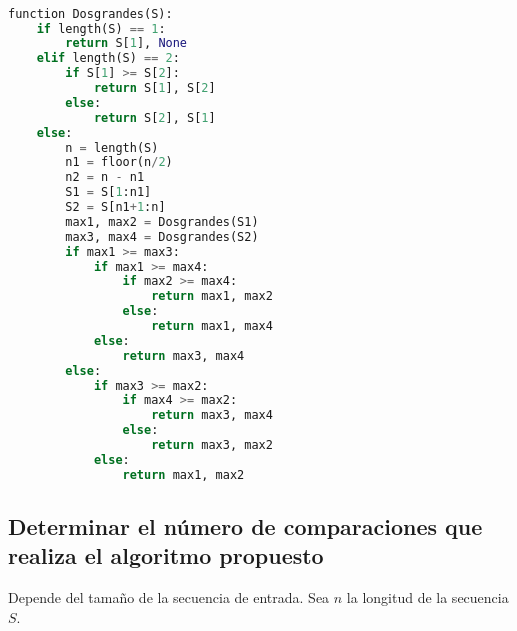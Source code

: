 \begin{lstlisting}[language=python]

function Dosgrandes(S):
    if length(S) == 1:
        return S[1], None
    elif length(S) == 2:
        if S[1] >= S[2]:
            return S[1], S[2]
        else:
            return S[2], S[1]
    else:
        n = length(S)
        n1 = floor(n/2)
        n2 = n - n1
        S1 = S[1:n1]
        S2 = S[n1+1:n]
        max1, max2 = Dosgrandes(S1)
        max3, max4 = Dosgrandes(S2)
        if max1 >= max3:
            if max1 >= max4:
                if max2 >= max4:
                    return max1, max2
                else:
                    return max1, max4
            else:
                return max3, max4
        else:
            if max3 >= max2:
                if max4 >= max2:
                    return max3, max4
                else:
                    return max3, max2
            else:
                return max1, max2
\end{lstlisting}


\subsection{Determinar el número de comparaciones que realiza el algoritmo propuesto}

Depende del tamaño de la secuencia de entrada. Sea $n$ la longitud de la secuencia $S$.

